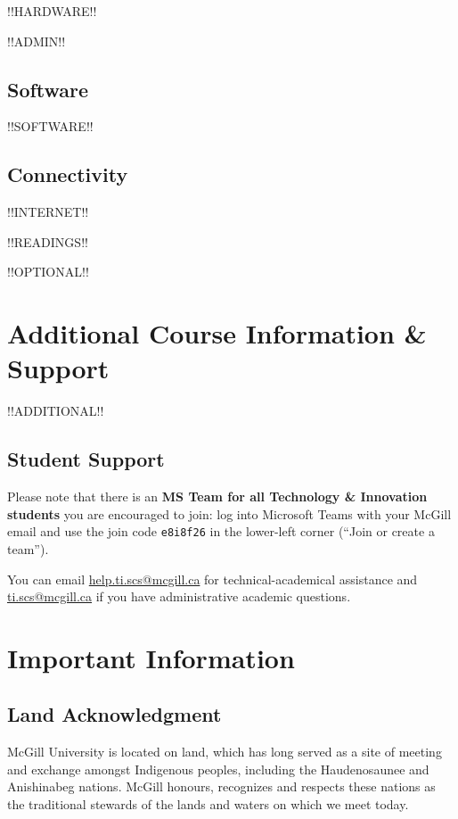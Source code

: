 \documentclass{article}
\begin{document}
!!HARDWARE!!

!!ADMIN!!

\subsection{Software}

!!SOFTWARE!!

\subsection{Connectivity}

!!INTERNET!!

\newpage

!!READINGS!!

!!OPTIONAL!!

\section{{Additional Course Information \& Support}}

!!ADDITIONAL!!

\subsection{Student Support}

Please note that there is an {\bf MS Team for all Technology \& Innovation
students} you are encouraged to join: log into Microsoft Teams with
your McGill email and use the join code \texttt{e8i8f26} in the
lower-left corner (``Join or create a team'').

You can email
\href{mailto:help.ti.scs@mcgill.ca}{help.ti.scs@mcgill.ca} for
technical-academical assistance and
\href{mailto:ti.scs@mcgill.ca}{ti.scs@mcgill.ca} if you have
administrative academic questions.

\newpage

\section{Important Information}

\subsection{Land Acknowledgment}

McGill University is located on land, which has long served as a site
of meeting and exchange amongst Indigenous peoples, including the
Haudenosaunee and Anishinabeg nations. McGill honours, recognizes and
respects these nations as the traditional stewards of the lands and
waters on which we meet today.
\end{document}
